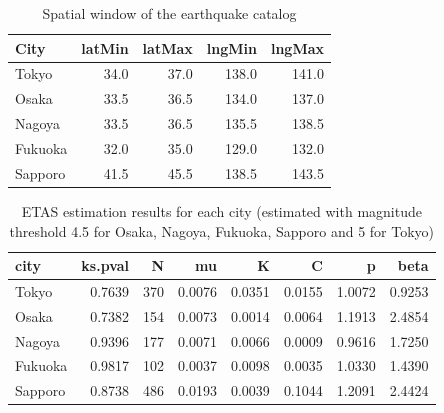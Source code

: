 \documentclass[
]{article}
\newenvironment{Shaded}{\begin{snugshade}}{\end{snugshade}}
\newcommand{\DataTypeTok}[1]{\textcolor[rgb]{0.13,0.29,0.53}{#1}}
\newcommand{\DecValTok}[1]{\textcolor[rgb]{0.00,0.00,0.81}{#1}}
\newcommand{\KeywordTok}[1]{\textcolor[rgb]{0.13,0.29,0.53}{\textbf{#1}}}
\newcommand{\NormalTok}[1]{#1}
\newcommand{\OperatorTok}[1]{\textcolor[rgb]{0.81,0.36,0.00}{\textbf{#1}}}
\newcommand{\OtherTok}[1]{\textcolor[rgb]{0.56,0.35,0.01}{#1}}
\newcommand{\StringTok}[1]{\textcolor[rgb]{0.31,0.60,0.02}{#1}}
\begin{document}
\begin{table}[H]

\caption{\label{tab:unnamed-chunk-3}Spatial window of the earthquake catalog}
\centering
\begin{tabular}[t]{lrrrr}
\toprule
City & latMin & latMax & lngMin & lngMax\\
\midrule
Tokyo & 34.0 & 37.0 & 138.0 & 141.0\\
Osaka & 33.5 & 36.5 & 134.0 & 137.0\\
Nagoya & 33.5 & 36.5 & 135.5 & 138.5\\
Fukuoka & 32.0 & 35.0 & 129.0 & 132.0\\
Sapporo & 41.5 & 45.5 & 138.5 & 143.5\\
\bottomrule
\end{tabular}
\end{table}

\begin{Shaded}
\end{Shaded}

\begin{table}[H]

\caption{\label{tab:unnamed-chunk-3}ETAS estimation results for each city (estimated with magnitude 
      threshold 4.5 for Osaka, Nagoya, Fukuoka, Sapporo and 5 for Tokyo)}
\centering
\begin{tabular}[t]{lrrrrrrr}
\toprule
city & ks.pval & N & mu & K & C & p & beta\\
\midrule
Tokyo & 0.7639 & 370 & 0.0076 & 0.0351 & 0.0155 & 1.0072 & 0.9253\\
Osaka & 0.7382 & 154 & 0.0073 & 0.0014 & 0.0064 & 1.1913 & 2.4854\\
Nagoya & 0.9396 & 177 & 0.0071 & 0.0066 & 0.0009 & 0.9616 & 1.7250\\
Fukuoka & 0.9817 & 102 & 0.0037 & 0.0098 & 0.0035 & 1.0330 & 1.4390\\
Sapporo & 0.8738 & 486 & 0.0193 & 0.0039 & 0.1044 & 1.2091 & 2.4424\\
\bottomrule
\end{tabular}
\end{table}
\end{document}

